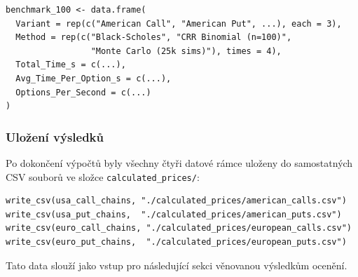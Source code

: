 \begin{verbatim}
benchmark_100 <- data.frame(
  Variant = rep(c("American Call", "American Put", ...), each = 3),
  Method = rep(c("Black-Scholes", "CRR Binomial (n=100)",
                 "Monte Carlo (25k sims)"), times = 4),
  Total_Time_s = c(...),
  Avg_Time_Per_Option_s = c(...),
  Options_Per_Second = c(...)
)
\end{verbatim}

\subsubsection{Uložení výsledků}

Po dokončení výpočtů byly všechny čtyři datové rámce uloženy do samostatných CSV souborů ve složce \texttt{calculated\_prices/}:

\begin{verbatim}
write_csv(usa_call_chains, "./calculated_prices/american_calls.csv")
write_csv(usa_put_chains,  "./calculated_prices/american_puts.csv")
write_csv(euro_call_chains, "./calculated_prices/european_calls.csv")
write_csv(euro_put_chains,  "./calculated_prices/european_puts.csv")
\end{verbatim}

Tato data slouží jako vstup pro následující sekci věnovanou výsledkům ocenění.
